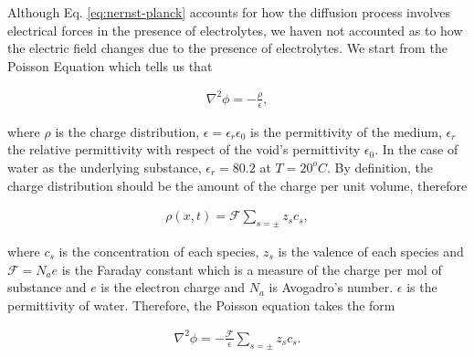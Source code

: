 Although Eq. \ref{eq:nernst-planck} accounts for how the diffusion process involves electrical forces in the presence of electrolytes, we haven not accounted as to how the electric field changes due to the presence of electrolytes. 
We start from the Poisson Equation which tells us that

\begin{align}
	\nabla^2 \phi = -\frac{\rho}{\epsilon},
\end{align}

where $\rho$ is the charge distribution, $\epsilon = \epsilon_r \epsilon_0$ is the permittivity of the medium, $\epsilon_r$ the relative permittivity with respect of the void's permittivity $\epsilon_0$. In the case of water as the underlying substance, $\epsilon_r = 80.2$ at $T=20^oC$. By definition, the charge distribution should be the amount of the charge per unit volume, therefore

\begin{align}
	\rho(x,t) = \mathcal{F}\sum_{s=\pm} z_sc_s,
\end{align}

where $c_s$ is the concentration of each species, $z_s$ is the valence of each species and $\mathcal{F} = N_ae$ is the Faraday constant which is a measure of the charge per mol of substance and $e$ is the electron charge and $N_a$ is Avogadro's number. $\epsilon$ is the permittivity of water. Therefore, the Poisson equation takes the form

\begin{align}
	\label{eq:poisson-electrolyte}
	\nabla^2 \phi = -\frac{\mathcal{F}}{\epsilon}\sum_{s=\pm} z_sc_s.
\end{align}














